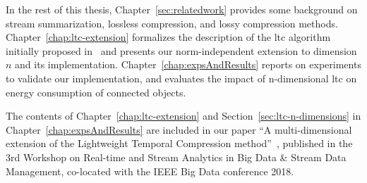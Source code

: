 
In the rest of this thesis, Chapter~\ref{sec:relatedwork} provides some
background on stream summarization, lossless compression, and lossy compression
methods. Chapter~\ref{chap:ltc-extension} formalizes the description of the
\acrshort{ltc} algorithm initially proposed
in~\cite{schoellhammer2004lightweight} and presents our norm-independent
extension to dimension $n$ and its implementation.
Chapter~\ref{chap:expsAndResults} reports on experiments to validate our
implementation, and evaluates the impact of n-dimensional \acrshort{ltc} on
energy consumption of connected objects.

The contents of Chapter~\ref{chap:ltc-extension} and
Section~\ref{sec:ltc-n-dimensions} in Chapter~\ref{chap:expsAndResults} are
included in our paper ``A multi-dimensional extension of the Lightweight
Temporal Compression method''~\cite{li2018multi}, published in the 3rd
Workshop on Real-time and Stream Analytics in Big Data \& Stream Data
Management, co-located with the IEEE Big Data conference 2018.


